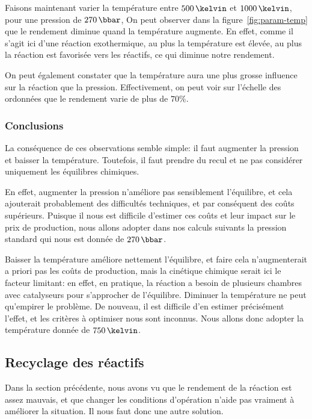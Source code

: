 Faisons maintenant varier la température entre $500\,\kelvin$ et $1000\,\kelvin$, pour une pression de $270\,\bbar$,
On peut observer dans la figure~\ref{fig:param-temp} que le rendement diminue quand la température augmente. En effet, comme il s'agit ici d'une réaction exothermique, au plus la température est élevée, au plus la réaction est favorisée vers les réactifs, ce qui diminue notre rendement.

On peut également constater que la température aura une plus grosse influence sur la réaction que la pression. Effectivement, on peut voir sur l'échelle des ordonnées que le rendement varie de plus de $70\%$.

\subsubsection{Conclusions}

La conséquence de ces observations semble simple:
il faut augmenter la pression et baisser la température.
Toutefois, il faut prendre du recul et ne pas considérer uniquement
les équilibres chimiques.

En effet, augmenter la pression n'améliore pas sensiblement l'équilibre,
et cela ajouterait probablement des difficultés techniques, et par conséquent
des coûts supérieurs. Puisque il nous est difficile d'estimer ces coûts et leur
impact sur le prix de production, nous allons adopter dans nos calculs suivants
la pression standard qui nous est donnée de $270\,\bbar$.

Baisser la température améliore nettement l'équilibre,
et faire cela n'augmenterait a priori pas les coûts de production,
mais la cinétique chimique serait ici le facteur limitant:
en effet, en pratique, la réaction a besoin de plusieurs chambres
avec catalyseurs pour s'approcher de l'équilibre.
Diminuer la température ne peut qu'empirer le problème.
De nouveau, il est difficile d'en estimer précisément l'effet,
et les critères à optimiser nous sont inconnus.
Nous allons donc adopter la température donnée de $750\,\kelvin$.

\subsection{Recyclage des réactifs}

Dans la section précédente, nous avons vu que le rendement de la réaction
est assez mauvais, et que changer les conditions d'opération n'aide pas
vraiment à améliorer la situation.
Il nous faut donc une autre solution.

